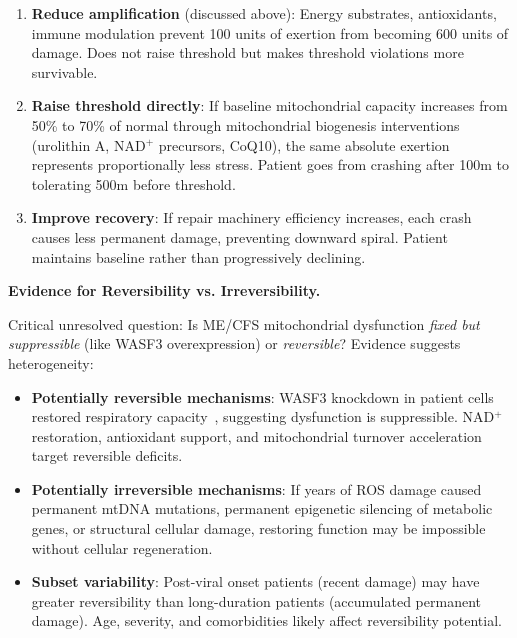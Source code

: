 \begin{enumerate}
    \item \textbf{Reduce amplification} (discussed above): Energy substrates, antioxidants, immune modulation prevent 100 units of exertion from becoming 600 units of damage. Does not raise threshold but makes threshold violations more survivable.

    \item \textbf{Raise threshold directly}: If baseline mitochondrial capacity increases from 50\% to 70\% of normal through mitochondrial biogenesis interventions (urolithin A, NAD$^+$ precursors, CoQ10), the same absolute exertion represents proportionally less stress. Patient goes from crashing after 100m to tolerating 500m before threshold.

    \item \textbf{Improve recovery}: If repair machinery efficiency increases, each crash causes less permanent damage, preventing downward spiral. Patient maintains baseline rather than progressively declining.
\end{enumerate}

\textbf{Evidence for Reversibility vs. Irreversibility.}

Critical unresolved question: Is ME/CFS mitochondrial dysfunction \textit{fixed but suppressible} (like WASF3 overexpression) or \textit{reversible}? Evidence suggests heterogeneity:

\begin{itemize}
    \item \textbf{Potentially reversible mechanisms}: WASF3 knockdown in patient cells restored respiratory capacity~\cite{wang2023wasf3}, suggesting dysfunction is suppressible. NAD$^+$ restoration, antioxidant support, and mitochondrial turnover acceleration target reversible deficits.

    \item \textbf{Potentially irreversible mechanisms}: If years of ROS damage caused permanent mtDNA mutations, permanent epigenetic silencing of metabolic genes, or structural cellular damage, restoring function may be impossible without cellular regeneration.

    \item \textbf{Subset variability}: Post-viral onset patients (recent damage) may have greater reversibility than long-duration patients (accumulated permanent damage). Age, severity, and comorbidities likely affect reversibility potential.
\end{itemize}

